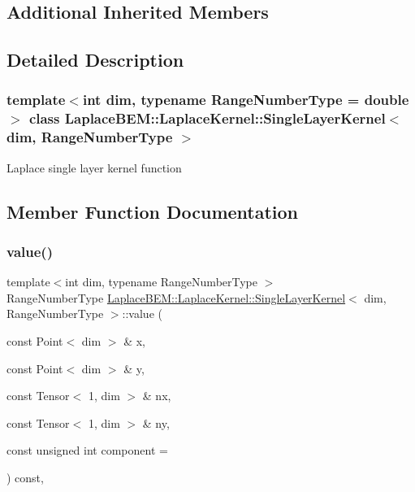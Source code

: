 \subsection*{Additional Inherited Members}


\subsection{Detailed Description}
\subsubsection*{template$<$int dim, typename Range\+Number\+Type = double$>$\newline
class Laplace\+B\+E\+M\+::\+Laplace\+Kernel\+::\+Single\+Layer\+Kernel$<$ dim, Range\+Number\+Type $>$}

Laplace single layer kernel function 

\subsection{Member Function Documentation}
\mbox{\label{classLaplaceBEM_1_1LaplaceKernel_1_1SingleLayerKernel_a657e04bd67d8c33adeea1b9d282d6136}} 
\subsubsection{\texorpdfstring{value()}{value()}}
{\footnotesize\ttfamily template$<$int dim, typename Range\+Number\+Type $>$ \\
Range\+Number\+Type \hyperlink{classLaplaceBEM_1_1LaplaceKernel_1_1SingleLayerKernel}{Laplace\+B\+E\+M\+::\+Laplace\+Kernel\+::\+Single\+Layer\+Kernel}$<$ dim, Range\+Number\+Type $>$\+::value (\begin{DoxyParamCaption}\item[{const Point$<$ dim $>$ \&}]{x,  }\item[{const Point$<$ dim $>$ \&}]{y,  }\item[{const Tensor$<$ 1, dim $>$ \&}]{nx,  }\item[{const Tensor$<$ 1, dim $>$ \&}]{ny,  }\item[{const unsigned int}]{component = {} }\end{DoxyParamCaption}) const\hspace{0.3cm}{\ttfamily [override]}, {\ttfamily [virtual]}}


